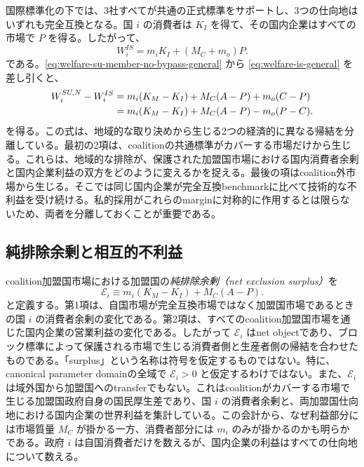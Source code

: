 国際標準化の下では、3社すべてが共通の正式標準をサポートし、3つの仕向地はいずれも完全互換となる。国 $i$ の消費者は $K_I$ を得て、その国内企業はすべての市場で $P$ を得る。したがって、
\begin{equation}
    W_i^{IS}
    =m_iK_I+(M_C+m_o)P.
    \label{eq:welfare-is-general}
\end{equation}
である。\eqref{eq:welfare-su-member-no-bypass-general} から \eqref{eq:welfare-is-general} を差し引くと、
\begin{align}
    W_i^{SU,N}-W_i^{IS}
    & =m_i(K_M-K_I)+M_C(A-P)+m_o(C-P) \notag\\
    & =m_i(K_M-K_I)+M_C(A-P)-m_o(P-C).
    \label{eq:su-no-bypass-direct-gap}
\end{align}
を得る。この式は、地域的な取り決めから生じる2つの経済的に異なる帰結を分離している。最初の2項は、coalitionの共通標準がカバーする市場だけから生じる。これらは、地域的な排除が、保護された加盟国市場における国内消費者余剰と国内企業利益の双方をどのように変えるかを捉える。最後の項はcoalition外市場から生じる。そこでは同じ国内企業が完全互換benchmarkに比べて技術的な不利益を受け続ける。私的採用がこれらのmarginに対称的に作用するとは限らないため、両者を分離しておくことが重要である。

\subsection{純排除余剰と相互的不利益}
\label{subsec:selective-decomposition}

coalition加盟国市場における加盟国の\emph{純排除余剰（net exclusion surplus）}を
\begin{equation}
    \mathscr E_i
    \equiv
    m_i(K_M-K_I)+M_C(A-P).
    \label{eq:exclusion-surplus}
\end{equation}
と定義する。第1項は、自国市場が完全互換市場ではなく加盟国市場であるときの国 $i$ の消費者余剰の変化である。第2項は、すべてのcoalition加盟国市場を通じた国内企業の営業利益の変化である。したがって $\mathscr E_i$ はnet objectであり、ブロック標準によって保護される市場で生じる消費者側と生産者側の帰結を合わせたものである。「surplus」という名称は符号を仮定するものではない。特に、canonical parameter domainの全域で $\mathscr E_i>0$ と仮定するわけではない。また、$\mathscr E_i$ は域外国から加盟国へのtransferでもない。これはcoalitionがカバーする市場で生じる加盟国政府自身の国民厚生差であり、国 $i$ の消費者余剰と、両加盟国仕向地における国内企業の世界利益を集計している。この会計から、なぜ利益部分には市場質量 $M_C$ が掛かる一方、消費者部分には $m_i$ のみが掛かるのかも明らかである。政府 $i$ は自国消費者だけを数えるが、国内企業の利益はすべての仕向地について数える。

